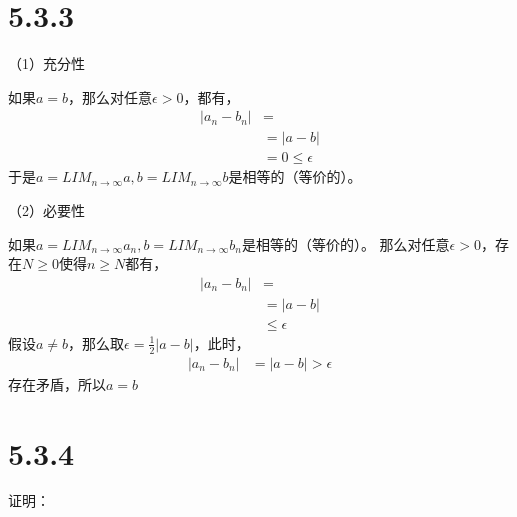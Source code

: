 \documentclass{article}
\theoremstyle{mystyle}
\begin{document}
\section*{5.3.3}

（1）充分性

如果$a=b$，那么对任意$\epsilon > 0$，都有，
\begin{align*}
  |a_n - b_n| & =                 \\
              & = |a-b|           \\
              & = 0 \leq \epsilon
\end{align*}
于是$a=LIM_{n \rightarrow \infty}a,b=LIM_{n \rightarrow \infty}b$是相等的（等价的）。

（2）必要性

如果$a=LIM_{n \rightarrow \infty}a_n, b=LIM_{n \rightarrow \infty}b_n$是相等的（等价的）。
那么对任意$\epsilon > 0$，存在$N \geq 0$使得$n \geq N$都有，
\begin{align*}
  |a_n - b_n| & =             \\
              & = |a-b|       \\
              & \leq \epsilon
\end{align*}
假设$a \neq b$，那么取$\epsilon = \frac{1}{2}|a-b|$，此时，
\begin{align*}
  |a_n - b_n| & =  |a-b| > \epsilon
\end{align*}
存在矛盾，所以$a=b$

\section*{5.3.4}

证明：
\end{document}
